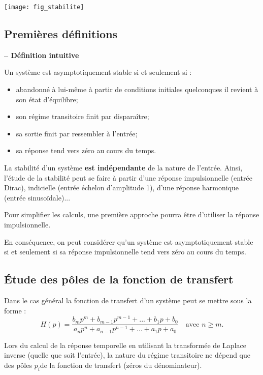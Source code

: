 \begin{center}
\texttt{[image: fig\_stabilite]}
\end{center}
\subsection{Premières définitions}
\begin{defi}\textbf{ -- Définition intuitive}

Un système est asymptotiquement stable si et seulement si : 
\begin{itemize}
\item abandonné à lui-même à partir de conditions initiales quelconques il revient à son état d'équilibre;
\item son régime transitoire finit par disparaître;
\item sa sortie finit par ressembler à l'entrée;
\item sa réponse tend vers zéro au cours du temps.
\end{itemize}

\end{defi}

\begin{rem}
La stabilité d'un système \textbf{est indépendante} de la nature de l'entrée. Ainsi, l'étude de la stabilité peut se faire à partir d'une réponse impulsionnelle (entrée Dirac), indicielle (entrée échelon d'amplitude 1), d'une réponse harmonique (entrée sinusoïdale)...

Pour simplifier les calculs, une première approche pourra être d'utiliser la réponse impulsionnelle. 
\end{rem}
\begin{defi}
En conséquence, on peut considérer qu'un système est asymptotiquement stable si et seulement si sa réponse impulsionnelle tend vers zéro au cours du temps.
\end{defi}

\subsection{Étude des pôles de la fonction de transfert}
Dans le cas général la fonction de transfert d'un système peut se mettre sous la forme :
$$
H(p)=\dfrac{b_mp^m + b_{m-1}p^{m-1}+...+b_1p+b_0}{a_np^n + a_{n-1}p^{n-1}+...+a_1p+a_0} \quad \text{avec } n\geq m.
$$

Lors du calcul de la réponse temporelle en utilisant la transformée de Laplace inverse (quelle que soit l'entrée), la nature du régime transitoire ne dépend que des pôles $p_i$de la fonction de transfert (zéros du dénominateur).

